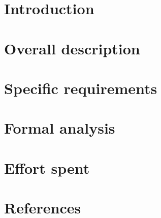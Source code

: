 \documentclass{article}
\begin{document}
\newpage

\tableofcontents

\newpage

\section{Introduction}


\newpage

\section{Overall description}


\newpage

\section{Specific requirements}



\newpage

\section{Formal analysis}

\newpage

\section{Effort spent}

\newpage

\section{References}

\end{document}
